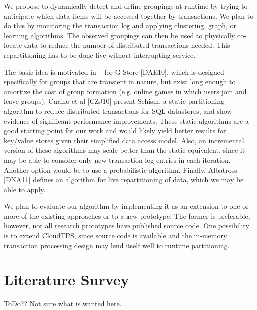 \documentclass[10pt,final,journal]{IEEEtran}
\begin{document}
We propose to dynamically detect and define groupings at runtime by trying to anticipate which data items will be accessed together by transactions. We plan to do this by monitoring the transaction log and applying clustering, graph, or learning algorithms. The observed groupings can then be used to physically co-locate data to reduce the number of distributed transactions needed. This repartitioning has to be done live without interrupting service.

The basic idea is motivated in ~\cite{DAS11} for G-Store [DAE10], which is designed specifically for groups that are transient in nature, but exist long enough to amortize the cost of group formation (e.g. online games in which users join and leave groups). Curino et al [CZJ10] present Schism, a static partitioning algorithm to reduce distributed transactions for SQL datastores, and show evidence of significant performance improvements. These static algorithms are a good starting point for our work and would likely yield better results for key/value stores given their simplified data access model. Also, an incremental version of these algorithms may scale better than the static equivalent, since it may be able to consider only new transaction log entries in each iteration. Another option would be to use a probabilistic algorithm. Finally, Albatross [DNA11] defines an algorithm for live repartitioning of data, which we may be able to apply.

We plan to evaluate our algorithm by implementing it as an extension to one or more of the existing approaches or to a new prototype. The former is preferable, however, not all research prototypes have published source code. One possibility is to extend CloudTPS, since source code is available and the in-memory transaction processing design may lend itself well to runtime partitioning.

\section{Literature Survey}
ToDo?? Not sure what is wanted here.



\end{document}
